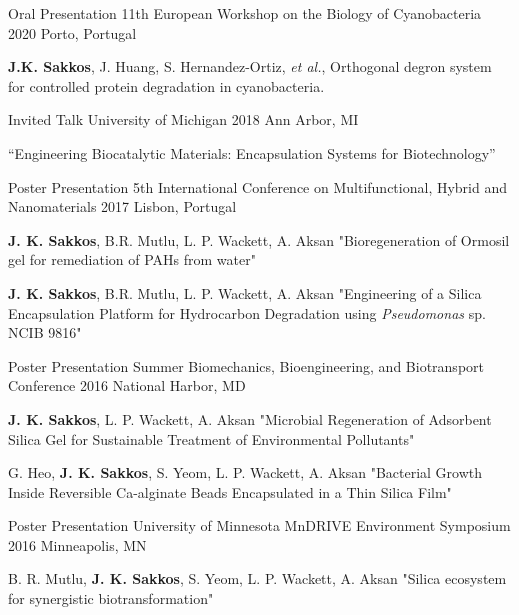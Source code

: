 \documentclass[11pt, letterpaper]{awesome-cv} %
\begin{document}
\begin{sloppypar}
\begin{cventries}

	\cventry
	{Oral Presentation}
	{11th European Workshop on the Biology of Cyanobacteria}
	{2020} %
	{Porto, Portugal} %
	{ %
		\begin{cvitems}
			\item {\textbf{J.K. Sakkos}, J. Huang, S. Hernandez-Ortiz, \textit{et al.}, Orthogonal degron system for controlled protein degradation in cyanobacteria.}
		\end{cvitems}
	}
	\cventry
	{Invited Talk}
	{University of Michigan}
	{2018} %
	{Ann Arbor, MI} %
	{ %
		\begin{cvitems}
			\item {“Engineering Biocatalytic Materials: Encapsulation Systems for Biotechnology”}
		\end{cvitems}
	}

	\cventry
	{Poster Presentation}
	{5th International Conference on Multifunctional, Hybrid and Nanomaterials}
	{2017} %
	{Lisbon, Portugal} %
	{ %
		\begin{cvitems}
			\item {\textbf{J. K. Sakkos}, B.R. Mutlu, L. P. Wackett, A. Aksan "Bioregeneration of Ormosil gel for remediation of PAHs from water"}
			\item {\textbf{J. K. Sakkos}, B.R. Mutlu, L. P. Wackett, A. Aksan "Engineering of a Silica Encapsulation Platform for Hydrocarbon Degradation using \textit{Pseudomonas} sp. NCIB 9816"}
		\end{cvitems}
	}

	\cventry
	{Poster Presentation}
	{Summer Biomechanics, Bioengineering, and Biotransport Conference}
	{2016} %
	{National Harbor, MD} %
	{ %
		\begin{cvitems}
			\item {\textbf{J. K. Sakkos}, L. P. Wackett, A. Aksan "Microbial Regeneration of Adsorbent Silica Gel for Sustainable Treatment of Environmental Pollutants"}
			\item {G. Heo, \textbf{J. K. Sakkos}, S. Yeom, L. P. Wackett, A. Aksan "Bacterial Growth Inside Reversible Ca-alginate Beads Encapsulated in a Thin Silica Film"}
		\end{cvitems}
	}
	\cventry
	{Poster Presentation}
	{University of Minnesota MnDRIVE Environment Symposium}
	{2016} %
	{Minneapolis, MN} %
	{ %
		\begin{cvitems}
			\item {B. R. Mutlu, \textbf{J. K. Sakkos}, S. Yeom, L. P. Wackett, A. Aksan "Silica ecosystem for synergistic biotransformation"}
		\end{cvitems}
	}


\end{cventries}
\end{sloppypar}
\end{document}

